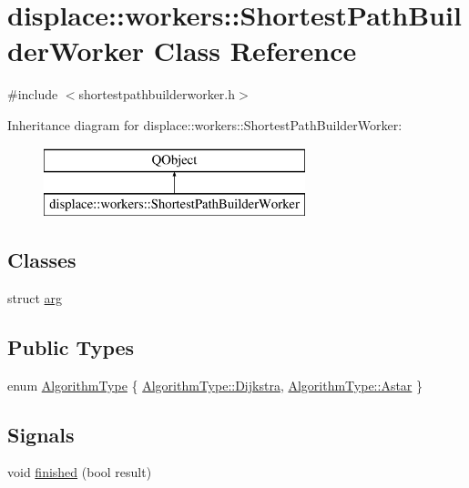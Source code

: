 \hypertarget{classdisplace_1_1workers_1_1_shortest_path_builder_worker}{}\section{displace\+::workers\+::Shortest\+Path\+Builder\+Worker Class Reference}
\label{classdisplace_1_1workers_1_1_shortest_path_builder_worker}


{\ttfamily \#include $<$shortestpathbuilderworker.\+h$>$}

Inheritance diagram for displace\+::workers\+::Shortest\+Path\+Builder\+Worker\+:\begin{figure}[H]
\begin{center}
\leavevmode
\includegraphics[height=2.000000cm]{d6/db1/classdisplace_1_1workers_1_1_shortest_path_builder_worker}
\end{center}
\end{figure}
\subsection*{Classes}
\begin{DoxyCompactItemize}
\item 
struct \mbox{\hyperlink{structdisplace_1_1workers_1_1_shortest_path_builder_worker_1_1arg}{arg}}
\end{DoxyCompactItemize}
\subsection*{Public Types}
\begin{DoxyCompactItemize}
\item 
enum \mbox{\hyperlink{classdisplace_1_1workers_1_1_shortest_path_builder_worker_a20590f897e75d7555cf40c2c65f8845a}{Algorithm\+Type}} \{ \mbox{\hyperlink{classdisplace_1_1workers_1_1_shortest_path_builder_worker_a20590f897e75d7555cf40c2c65f8845aa052d7289884a0d0dae24aa88a7e62e83}{Algorithm\+Type\+::\+Dijkstra}}, 
\mbox{\hyperlink{classdisplace_1_1workers_1_1_shortest_path_builder_worker_a20590f897e75d7555cf40c2c65f8845aa990f46a91922945a4836b666ddc0527f}{Algorithm\+Type\+::\+Astar}}
 \}
\end{DoxyCompactItemize}
\subsection*{Signals}
\begin{DoxyCompactItemize}
\item 
void \mbox{\hyperlink{classdisplace_1_1workers_1_1_shortest_path_builder_worker_af36ecb935dc57de67e1189cebaf09765}{finished}} (bool result)
\end{DoxyCompactItemize}
